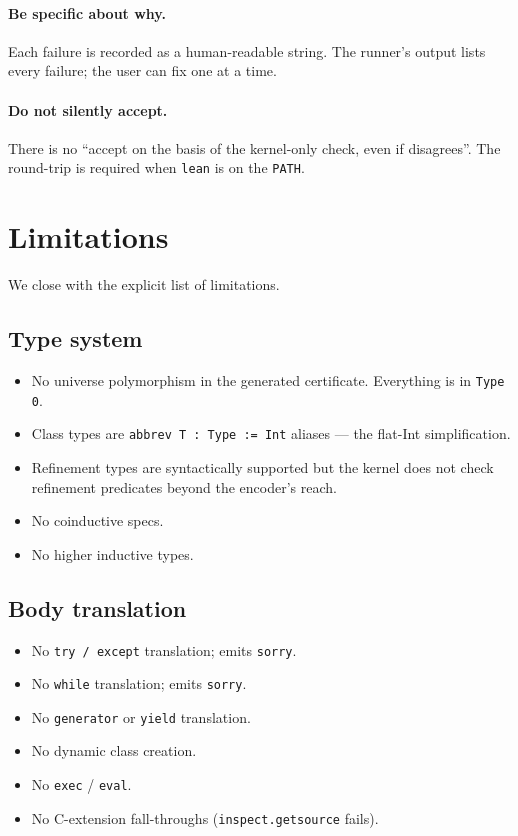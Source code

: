 \paragraph{Be specific about why.}  Each failure is recorded as a
human-readable string.  The runner's output lists every failure;
the user can fix one at a time.

\paragraph{Do not silently accept.}  There is no ``accept on the
basis of the kernel-only check, even if \Lean{} disagrees''.  The
\Lean{} round-trip is required when \texttt{lean} is on the
\texttt{PATH}.

\section{Limitations}
\label{sec:limits}

We close with the explicit list of limitations.

\subsection{Type system}

\begin{itemize}[leftmargin=1.7em]
  \item No universe polymorphism in the generated certificate.
    Everything is in \texttt{Type 0}.
  \item Class types are \texttt{abbrev T : Type := Int} aliases
    --- the flat-Int simplification.
  \item Refinement types are syntactically supported but the
    kernel does not check refinement predicates beyond the
    \Zthree{} encoder's reach.
  \item No coinductive specs.
  \item No higher inductive types.
\end{itemize}

\subsection{Body translation}

\begin{itemize}[leftmargin=1.7em]
  \item No \texttt{try / except} translation; emits \texttt{sorry}.
  \item No \texttt{while} translation; emits \texttt{sorry}.
  \item No \texttt{generator} or \texttt{yield} translation.
  \item No dynamic class creation.
  \item No \texttt{exec} / \texttt{eval}.
  \item No C-extension fall-throughs (\texttt{inspect.getsource}
    fails).
\end{itemize}

